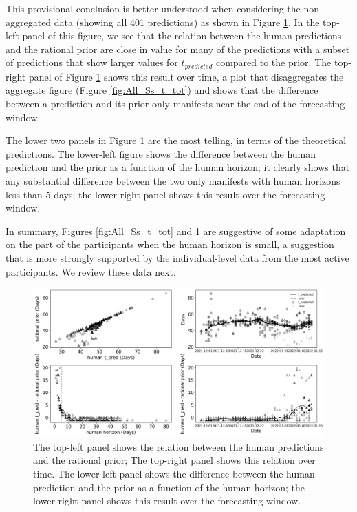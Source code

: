 \documentclass[a4paper,man,natbib]{apa6}
\begin{document}
This provisional conclusion is better understood when considering the non-aggregated data (showing all 401 predictions) as shown in Figure \ref{fig:All_S_Scatters}.  In the top-left panel of this figure, we see that the relation between the human predictions and the rational prior are close in value for many of the predictions with a subset of predictions that show larger values for $t_{predicted}$ compared to the prior.  The top-right panel of Figure \ref{fig:All_S_Scatters} shows this result over time, a plot that disaggregates the aggregate figure (Figure \ref{fig:All_Ss_t_tot}) and shows that the difference between a prediction and its prior only manifests near the end of the forecasting window.

The lower two panels in Figure \ref{fig:All_S_Scatters} are the most telling, in terms of the theoretical predictions.  The lower-left figure shows the difference between the human prediction and the prior as a function of the human horizon; it clearly shows that any substantial difference between the two only manifests with human horizons less than 5 days; the lower-right panel shows this result over the forecasting window.  

In summary, Figures \ref{fig:All_Ss_t_tot} and \ref{fig:All_S_Scatters} are suggestive of some adaptation on the part of the participants when the human horizon is small, a suggestion that is more strongly supported by the individual-level data from the most active participants.  We review these data next.

\begin{figure}
    \centering
    \includegraphics[width=\linewidth]{Figures/Study1_ExplanatoryScatter_All_S.png}
    \caption{The top-left panel shows the relation between the human predictions and the rational prior; The top-right panel shows this relation over time. The lower-left panel shows the difference between the human prediction and the prior as a function of the human horizon; the lower-right panel shows this result over the forecasting window.}
    \label{fig:All_S_Scatters}
\end{figure}
\end{document}
